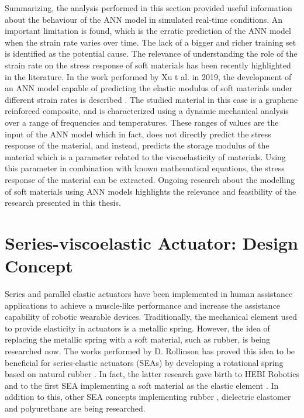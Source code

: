 Summarizing, the analysis performed in this section provided useful information about the behaviour of the ANN model in simulated real-time conditions. An important limitation is found, which is the erratic prediction of the ANN model when the strain rate varies over time. The lack of a bigger and richer training set is identified as the potential cause. The relevance of understanding the role of the strain rate on the stress response of soft materials has been recently highlighted in the literature. In the work performed by Xu t al. in 2019, the development of an ANN model capable of predicting the elastic modulus of soft materials under different strain rates is described \cite{xu2019artificial}. The studied material in this case is a graphene reinforced composite, and is characterized using a dynamic mechanical analysis over a range of frequencies and temperatures. These ranges of values are the input of the ANN model which in fact, does not directly predict the stress response of the material, and instead, predicts the storage modulus of the material which is a parameter related to the viscoelasticity of materials. Using this parameter in combination with known mathematical equations, the stress response of the material can be extracted. Ongoing research about the modelling of soft materials using ANN models highlights the relevance and feasibility of the research presented in this thesis.

\section{Series-viscoelastic Actuator: Design Concept }

Series and parallel elastic actuators have been implemented in human assistance applications to achieve a muscle-like performance and increase the assistance capability of robotic wearable devices. Traditionally, the mechanical element used to provide elasticity in actuators is a metallic spring. However, the idea of replacing the metallic spring with a soft material, such as rubber, is being researched now. The works performed by D. Rollinson has proved this idea to be beneficial for series-elastic actuators (SEAs) by developing a rotational spring based on natural rubber \cite{rollinson2013design,rollinson2014design}. In fact, the latter research gave birth to HEBI Robotics and to the first SEA implementing a soft material as the elastic element \cite{HEBI2019}. In addition to this, other SEA concepts implementing rubber \cite{austin2015control}, dielectric elastomer \cite{bolivar2016towards} and polyurethane \cite{martins2015polyurethane} are being researched.

